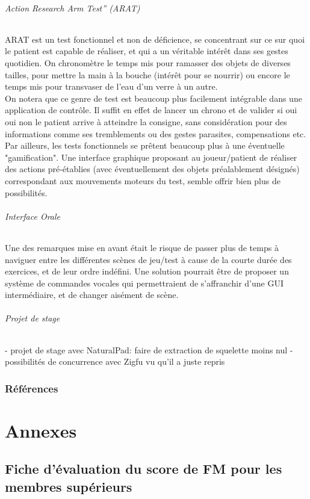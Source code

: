 \documentclass[french,12pt]{report}
\begin{document}
\paragraph{Action Research Arm Test” (ARAT) \\}
ARAT est un test fonctionnel et non de déficience, se concentrant sur ce sur quoi le patient est capable de réaliser, et
qui a un véritable intérêt dans ses gestes quotidien. On chronomètre le temps mis pour ramasser des objets de diverses tailles,
pour mettre la main à la bouche (intérêt pour se nourrir) ou encore le temps mis pour transvaser de l'eau d'un verre à un autre.
\\ On notera que ce genre de test est beaucoup plus facilement intégrable dans une application de contrôle. Il suffit en effet de 
lancer un chrono et de valider si oui oui non le patient arrive à atteindre la consigne, sans considération pour des informations
comme ses tremblements ou des gestes parasites, compensations etc. Par ailleurs, les tests fonctionnels se prêtent beaucoup
plus à une éventuelle "gamification". Une interface graphique proposant au joueur/patient de réaliser des actions pré-établies (avec éventuellement des objets préalablement désignés) correspondant aux mouvements moteurs du test, semble offrir bien
plus de possibilités.

\paragraph{Interface Orale}
Une des remarques mise en avant était le risque de passer plus de temps à naviguer entre les différentes scènes de jeu/test à cause de la courte durée des exercices, et de leur ordre indéfini. Une solution pourrait être de proposer un système de 
commandes vocales qui permettraient de s'affranchir d'une GUI intermédiaire, et de changer aisément de scène.
\paragraph{Projet de stage} %
		- projet de stage avec NaturalPad: faire de extraction de squelette moins nul		
		- possibilités de concurrence avec Zigfu vu qu'il a juste repris 
		
    \section{Références}
    
    
\part{Annexes}
	\chapter{Fiche d'évaluation du score de FM pour les membres supérieurs} \label{evaluation_FM}
\end{document}
